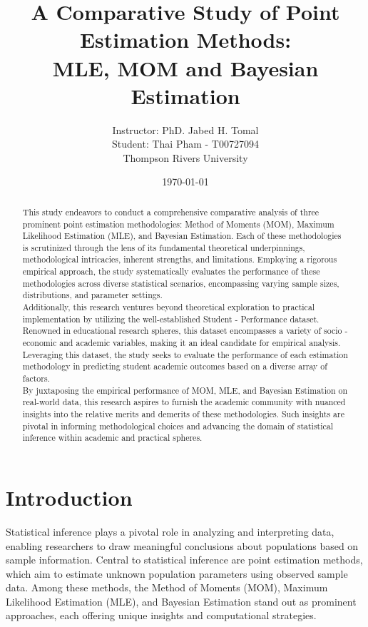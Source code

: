 \documentclass[12pt]{article}
\title{\textbf{A Comparative Study of Point Estimation Methods:
\\
MLE, MOM and Bayesian Estimation }}
\author{Instructor: PhD. Jabed H. Tomal
	\\ Student: Thai Pham - T00727094
	\\ Thompson Rivers University}
\date{\today}
\begin{document}
	
	\maketitle
	
	\begin{abstract}
		This study endeavors to conduct a comprehensive comparative analysis of three prominent point estimation methodologies: Method of Moments (MOM), Maximum Likelihood Estimation (MLE), and Bayesian Estimation. Each of these methodologies is scrutinized through the lens of its fundamental theoretical underpinnings, methodological intricacies, inherent strengths, and limitations. Employing a rigorous empirical approach, the study systematically evaluates the performance of these methodologies across diverse statistical scenarios, encompassing varying sample sizes, distributions, and parameter settings.
		\\
		Additionally, this research ventures beyond theoretical exploration to practical implementation by utilizing the well-established Student - Performance dataset. Renowned in educational research spheres, this dataset encompasses a variety of socio - economic and academic variables, making it an ideal candidate for empirical analysis. Leveraging this dataset, the study seeks to evaluate the performance of each estimation methodology in predicting student academic outcomes based on a diverse array of factors.
		\\
		By juxtaposing the empirical performance of MOM, MLE, and Bayesian Estimation on real-world data, this research aspires to furnish the academic community with nuanced insights into the relative merits and demerits of these methodologies. Such insights are pivotal in informing methodological choices and advancing the domain of statistical inference within academic and practical spheres.
			
	\end{abstract}
	
	\clearpage
	
	\section{Introduction}
	
	Statistical inference plays a pivotal role in analyzing and interpreting data, enabling researchers to draw meaningful conclusions about populations based on sample information. Central to statistical inference are point estimation methods, which aim to estimate unknown population parameters using observed sample data. Among these methods, the Method of Moments (MOM), Maximum Likelihood Estimation (MLE), and Bayesian Estimation stand out as prominent approaches, each offering unique insights and computational strategies.
	\\
	
\end{document}
